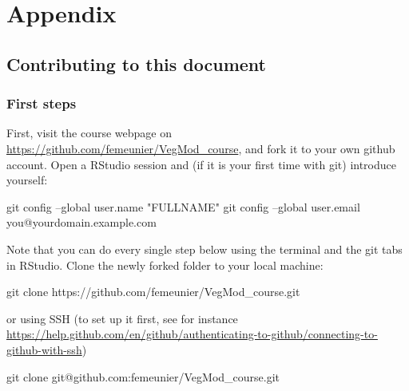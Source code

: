 \documentclass[12pt,oneside]{book}
\newenvironment{Shaded}{\begin{snugshade}}{\end{snugshade}}
\newcommand{\StringTok}[1]{\textcolor[rgb]{0.31,0.60,0.02}{#1}}
\newcommand{\FunctionTok}[1]{\textcolor[rgb]{0.00,0.00,0.00}{#1}}
\newcommand{\NormalTok}[1]{#1}
\begin{document}
\part{Appendix}\label{part-appendix}

\chapter*{Contributing to this
document}\label{contributing-to-this-document}

\section*{First steps}\label{first-steps}

First, visit the course webpage on
\url{https://github.com/femeunier/VegMod_course}, and fork it to your
own github account. Open a RStudio session and (if it is your first time
with git) introduce yourself:

\begin{Shaded}
\begin{Highlighting}[]
\FunctionTok{git}\NormalTok{ config --global user.name }\StringTok{"FULLNAME"}
\FunctionTok{git}\NormalTok{ config --global user.email you@yourdomain.example.com}
\end{Highlighting}
\end{Shaded}

Note that you can do every single step below using the terminal and the
git tabs in RStudio. Clone the newly forked folder to your local
machine:

\begin{Shaded}
\begin{Highlighting}[]
\FunctionTok{git}\NormalTok{ clone https://github.com/femeunier/VegMod_course.git}
\end{Highlighting}
\end{Shaded}

or using SSH (to set up it first, see for instance
\url{https://help.github.com/en/github/authenticating-to-github/connecting-to-github-with-ssh})

\begin{Shaded}
\begin{Highlighting}[]
\FunctionTok{git}\NormalTok{ clone git@github.com:femeunier/VegMod_course.git}
\end{Highlighting}
\end{Shaded}
\end{document}
